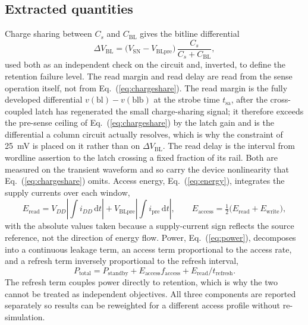 \documentclass[11pt,a4paper]{article}
\newcommand{\Vsn}{V_{\mathrm{SN}}}
\newcommand{\Vblpre}{V_{\mathrm{BLpre}}}
\newcommand{\Cs}{C_{s}}
\newcommand{\Cbl}{C_{\mathrm{BL}}}
\newcommand{\dVbl}{\Delta V_{\mathrm{BL}}}
\begin{document}
\subsection{Extracted quantities}

Charge sharing between $\Cs$ and $\Cbl$ gives the bitline differential
\begin{equation}
\dVbl = \bigl(\Vsn - \Vblpre\bigr)\,\frac{\Cs}{\Cs + \Cbl},
\label{eq:chargeshare}
\end{equation}
used both as an independent check on the circuit and, inverted, to define the
retention failure level. The read margin and read delay are read from the sense
operation itself, not from Eq.~(\ref{eq:chargeshare}). The read margin is the fully
developed differential $v(\mathrm{bl})-v(\mathrm{blb})$ at the strobe time
$t_{\mathrm{sa}}$, after the cross-coupled latch has regenerated the small
charge-sharing signal; it therefore exceeds the pre-sense ceiling of
Eq.~(\ref{eq:chargeshare}) by the latch gain and is the differential a column
circuit actually resolves, which is why the constraint of \SI{25}{\milli\volt} is
placed on it rather than on $\dVbl$. The read delay is the interval from wordline
assertion to the latch crossing a fixed fraction of its rail. Both are measured on
the transient waveform and so carry the device nonlinearity that
Eq.~(\ref{eq:chargeshare}) omits. Access energy, Eq.~(\ref{eq:energy}), integrates
the supply currents over each window,
\begin{equation}
E_{\mathrm{read}} = V_{DD}\!\left|\int i_{DD}\,\mathrm{d}t\right|
+ \Vblpre\!\left|\int i_{\mathrm{pre}}\,\mathrm{d}t\right|,
\qquad
E_{\mathrm{access}} = \tfrac{1}{2}\bigl(E_{\mathrm{read}}+E_{\mathrm{write}}\bigr),
\label{eq:energy}
\end{equation}
with the absolute values taken because a supply-current sign reflects the source
reference, not the direction of energy flow. Power, Eq.~(\ref{eq:power}), decomposes into a
continuous leakage term, an access term proportional to the access rate, and a
refresh term inversely proportional to the refresh interval,
\begin{equation}
P_{\mathrm{total}} = P_{\mathrm{standby}}
+ E_{\mathrm{access}} f_{\mathrm{access}}
+ E_{\mathrm{read}} / t_{\mathrm{refresh}} .
\label{eq:power}
\end{equation}
The refresh term couples power directly to retention, which is why the two cannot
be treated as independent objectives. All three components are reported separately
so results can be reweighted for a different access profile without
re-simulation.
\end{document}
